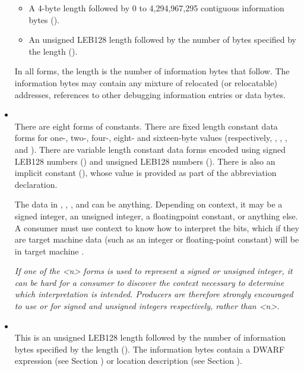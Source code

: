\begin{itemize}
\begin{itemize}
\item
A 4-byte length followed by 0 to 4,294,967,295 contiguous
information bytes (\DWFORMblockfourTARG).

\item
An unsigned LEB128
length followed by the number of bytes
specified by the length (\DWFORMblockTARG).
\end{itemize}

In all forms, the length is the number of information bytes
that follow. The information bytes may contain any mixture
of relocated (or relocatable) addresses, references to other
debugging information entries or data bytes.

\item {} \\
There are eight forms of constants. There are fixed length
constant data forms for one-, two-, four-, eight- and sixteen-byte values
(respectively, 
\DWFORMdataoneTARG, 
\DWFORMdatatwoTARG, 
\DWFORMdatafourTARG,
\DWFORMdataeightTARG{} and
\DWFORMdatasixteenTARG). 
There are variable length constant
data forms encoded using 
\bb
signed LEB128 numbers (\DWFORMsdataTARG) and unsigned 
LEB128 numbers (\DWFORMudataTARG).
\eb
There is also an implicit constant (\DWFORMimplicitconst),
whose value is provided as part of the abbreviation
declaration.

The data in \DWFORMdataone, 
\DWFORMdatatwo, 
\DWFORMdatafour{}, 
\DWFORMdataeight{} and
\DWFORMdatasixteen{} 
can be anything. Depending on context, it may
be a signed integer, an unsigned integer, a floating\dash point
constant, or anything else. A consumer must use context to
know how to interpret the bits, which if they are target
machine data (such as an integer or floating-point constant)
will be in target machine \byteorder.

\textit{If one of the \DWFORMdataTARG\textless n\textgreater 
forms is used to represent a
signed or unsigned integer, it can be hard for a consumer
to discover the context necessary to determine which
interpretation is intended. Producers are therefore strongly
encouraged to use \DWFORMsdata{} or 
\DWFORMudata{} for signed and
unsigned integers respectively, rather than 
\DWFORMdata\textless n\textgreater.}

\item {} \\
This is an unsigned LEB128 length followed by the
number of information bytes specified by the length
(\DWFORMexprlocTARG). 
The information bytes contain a DWARF expression 
(see Section ) 
or location description 
(see Section ).


\end{itemize}
